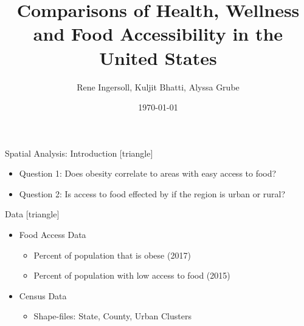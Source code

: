 \documentclass{beamer} %
\title[Comparisons of Health, Wellness and Food Accessibility in the United States]{Comparisons of Health, Wellness and Food Accessibility in the United States}
\institute[UNL]{University of Nebraska-Lincoln}
\author{Rene Ingersoll, Kuljit Bhatti, Alyssa Grube}
\date{\today}
\begin{document}


 

\begin{frame}

                \titlepage

\end{frame}

 


 

 

\begin{frame}

 

\end{frame}

 

\begin{frame}{Spatial Analysis: Introduction}
[triangle]
  \begin{itemize}
  \item Question 1: Does obesity correlate to areas with easy access to food?
  \item Question 2: Is access to food effected by if the region is urban or rural?
  \end{itemize}
\end{frame}

\begin{frame}{Data}
[triangle]
\begin{itemize}
  \item Food Access Data
    \begin{itemize}
        \item Percent of population that is obese (2017)
        \item Percent of population with low access to food (2015)
    \end{itemize}
    \item Census Data
        \begin{itemize}
            \item Shape-files: State, County, Urban Clusters
        \end{itemize}
\end{itemize}
\end{frame}
\end{document}

